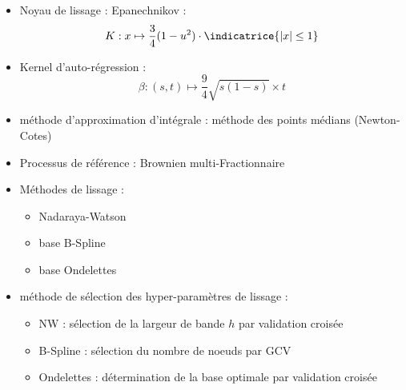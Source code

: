 
\begin{itemize}
    \item Noyau de lissage : Epanechnikov :
    $$K : x \mapsto \frac 3 4 (1 - u^2)\cdot \indicatrice{|x| \leq 1}$$
    \item Kernel d'auto-régression : 
    $$\beta : (s,t) \mapsto \frac 9 4 \sqrt{s(1-s)} \times t$$
    \item méthode d'approximation d'intégrale : méthode des points médians (Newton-Cotes)
    \item Processus de référence : Brownien multi-Fractionnaire
    \citationrequise
    \item Méthodes de lissage : 
    \begin{itemize}
        \item Nadaraya-Watson
        \item base B-Spline
        \item base Ondelettes
    \end{itemize}
    \item méthode de sélection des hyper-paramètres de lissage :
    \begin{itemize}
        \item NW : sélection de la largeur de bande $h$ par validation croisée
        \item B-Spline : sélection du nombre de noeuds par GCV
        \item Ondelettes : détermination de la base optimale par validation croisée
    \end{itemize}
\end{itemize}

